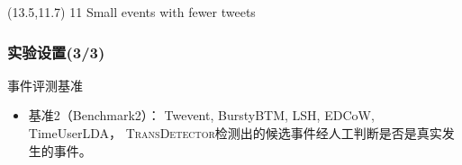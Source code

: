 \begin{frame}
\begin{textblock}{0.1}(13.5,11.7)
  \footnotesize{11 Small events with fewer tweets}
 \end{textblock}
\end{frame}

\begin{frame}
\frametitle{实验设置(3/3)}
\noindent 事件评测基准
\begin{itemize}
	\item 基准2（Benchmark2）： Twevent, BurstyBTM, LSH, EDCoW, TimeUserLDA， \textsc{TransDetector}检测出的候选事件经人工判断是否是真实发生的事件。
\end{itemize}
\end{frame}


